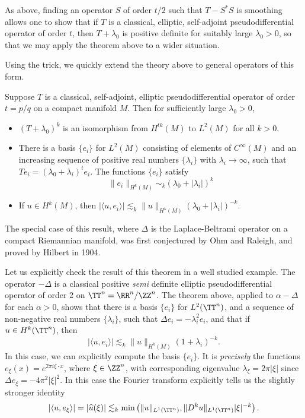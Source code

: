 \begin{remark}
    As above, finding an operator $S$ of order $t/2$ such that $T - S^*S$ is smoothing allows one to show that if $T$ is a classical, elliptic, self-adjoint pseudodifferential operator of order $t$, then $T + \lambda_0$ is positive definite for suitably large $\lambda_0 > 0$, so that we may apply the theorem above to a wider situation.
\end{remark}

Using the trick, we quickly extend the theory above to general operators of this form.

\begin{theorem}
    Suppose $T$ is a classical, self-adjoint, elliptic pseudodifferential operator of order $t = p/q$ on a compact manifold $M$. Then for sufficiently large $\lambda_0 > 0$,
    \begin{itemize}
        \item $(T + \lambda_0)^k$ is an isomorphism from $H^{tk}(M)$ to $L^2(M)$ for all $k > 0$.
        \item There is a basis $\{ e_i \}$ for $L^2(M)$ consisting of elements of $C^\infty(M)$ and an increasing sequence of positive real numbers $\{ \lambda_i \}$ with $\lambda_i \to \infty$, such that $Te_i = (\lambda_0 + \lambda_i)^t e_i$. The functions $\{ e_i \}$ satisfy
        \[ \| e_i \|_{H^k(M)} \sim_k (\lambda_0 + |\lambda_i|)^k \]
        \item If $u \in H^k(M)$, then $|\langle u, e_i \rangle| \lesssim_k \| u \|_{H^k(M)} (\lambda_0 + |\lambda_i|)^{-k}$.
    \end{itemize}
\end{theorem}

The special case of this result, where $\Delta$ is the Laplace-Beltrami operator on a compact Riemannian manifold, was first conjectured by Ohm and Raleigh, and proved by Hilbert in 1904.

\begin{example}
    Let us explicitly check the result of this theorem in a well studied example. The operator $-\Delta$ is a classical positive \emph{semi} definite elliptic pseudodifferential operator of order 2 on $\TT^n = \RR^n / \ZZ^n$. The theorem above, applied to $\alpha - \Delta$ for each $\alpha > 0$, shows that there is a basis $\{ e_i \}$ for $L^2(\TT^n)$, and a sequence of non-negative real numbers $\{ \lambda_i \}$, such that $\Delta e_i = - \lambda_i^2 e_i$, and that if $u \in H^k(\TT^n)$, then
    \[ |\langle u, e_i \rangle| \lesssim_k \| u \|_{H^k(M)} (1 + \lambda_i)^{-k}. \]
    In this case, we can explicitly compute the basis $\{ e_i \}$. It is \emph{precisely} the functions $e_\xi(x) = e^{2 \pi i \xi \cdot x}$, where $\xi \in \ZZ^n$, with corresponding eigenvalue $\lambda_\xi = 2 \pi |\xi|$ since $\Delta e_\xi = -4 \pi^2 |\xi|^2$. In this case the Fourier transform explicitly tells us the slightly stronger identity
    \[ |\langle u, e_\xi \rangle| = |\widehat{u}(\xi)| \lesssim_k \min \left( \| u \|_{L^1(\TT^n)}, \| D^k u \|_{L^1(\TT^n)} |\xi|^{-k} \right). \]
\end{example}

